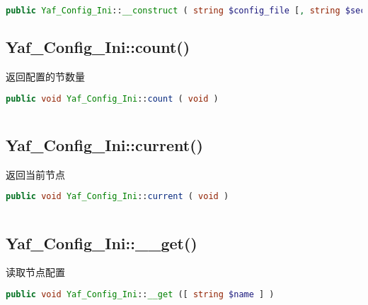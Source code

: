 \begin{lstlisting}[language=PHP]
public Yaf_Config_Ini::__construct ( string $config_file [, string $section ] )
\end{lstlisting}








\subsection{Yaf\_Config\_Ini::count()}

返回配置的节数量


\begin{lstlisting}[language=PHP]
public void Yaf_Config_Ini::count ( void )
\end{lstlisting}



\begin{lstlisting}[language=PHP]

\end{lstlisting}


\subsection{Yaf\_Config\_Ini::current()}


返回当前节点

\begin{lstlisting}[language=PHP]
public void Yaf_Config_Ini::current ( void )
\end{lstlisting}



\begin{lstlisting}[language=PHP]

\end{lstlisting}



\subsection{Yaf\_Config\_Ini::\_\_get()}


读取节点配置

\begin{lstlisting}[language=PHP]
public void Yaf_Config_Ini::__get ([ string $name ] )
\end{lstlisting}



\begin{lstlisting}[language=PHP]

\end{lstlisting}



